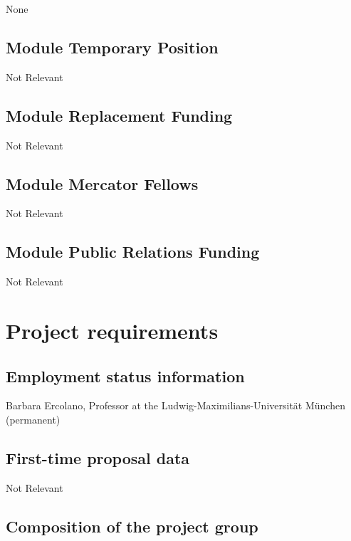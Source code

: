 \documentclass[10pt,fleqn,twoside]{article}
\newcommand{\Tcol}{\color{blue}}
\begin{document}
None 

\subsection{\Tcol Module Temporary Position}

Not Relevant

\subsection{\Tcol Module Replacement Funding}

Not Relevant

\subsection{\Tcol Module Mercator Fellows}

Not Relevant

\subsection{\Tcol Module Public Relations Funding}

Not Relevant

\section{\Tcol Project requirements}
\renewcommand{\leftmark}{\sc Project requirements}

\subsection{\Tcol Employment status information}

Barbara Ercolano, Professor at the Ludwig-Maximilians-Universit\"at
M\"unchen  (permanent)

\subsection{\Tcol First-time proposal data}

Not Relevant

\subsection{\Tcol Composition of the project group}
\end{document}
